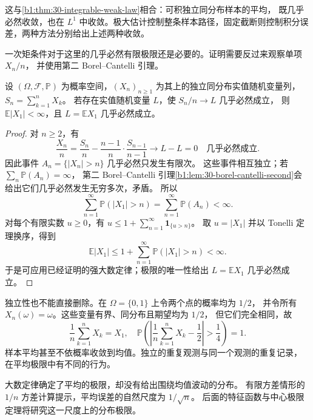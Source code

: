 这与\cref{b1:thm:30-integrable-weak-law}相合：可积独立同分布样本的平均，
既几乎必然收敛，也在 \(L^1\) 中收敛。极大估计控制整条样本路径，固定截断则控制积分误差，两种方法分别给出上述两种收敛。

\ProseParagraphBreak

一次矩条件对于这里的几乎必然有限极限还是必要的。证明需要反过来观察单项 \(X_n/n\)，
并使用第二 Borel--Cantelli 引理。

\begin{proposition}[有限极限所需的一次矩]
\label{b1:prop:30-strong-law-integrability-necessary}
设 \((\Omega,\mathcal F,\mathbb P)\) 为概率空间，\((X_n)_{n\geq1}\)
为其上的独立同分布实值随机变量列，\(S_n=\sum_{k=1}^nX_k\)。
若存在实值随机变量 \(L\)，使 \(S_n/n\to L\) 几乎必然成立，
则 \(\mathbb E|X_1|<\infty\)，且 \(L=\mathbb E X_1\) 几乎必然成立。
\end{proposition}
\begin{proof}
对 \(n\geq2\)，有
\[
 \frac{X_n}{n}
 =\frac{S_n}{n}-\frac{n-1}{n}\cdot\frac{S_{n-1}}{n-1}
 \longrightarrow L-L=0\quad\text{几乎必然成立}.
\]
因此事件 \(A_n=\{|X_n|>n\}\) 几乎必然只发生有限次。
这些事件相互独立；若 \(\sum_n\mathbb P(A_n)=\infty\)，
第二 Borel--Cantelli 引理\cref{b1:lem:30-borel-cantelli-second}会给出它们几乎必然发生无穷多次，矛盾。
所以
\[
 \sum_{n=1}^\infty\mathbb P(|X_1|>n)
 =\sum_{n=1}^\infty\mathbb P(A_n)<\infty.
\]
对每个有限实数 \(u\geq0\)，有
\(u\leq1+\sum_{n=1}^\infty\mathbf1_{\{u>n\}}\)。
取 \(u=|X_1|\) 并以 Tonelli 定理换序，得到
\[
 \mathbb E|X_1|
 \leq1+\sum_{n=1}^\infty\mathbb P(|X_1|>n)<\infty.
\]
于是可应用已经证明的强大数定律；极限的唯一性给出
\(L=\mathbb E X_1\) 几乎必然成立。
\end{proof}

独立性也不能直接删除。在 \(\Omega=\{0,1\}\) 上令两个点的概率均为 \(1/2\)，
并令所有 \(X_n(\omega)=\omega\)。这些变量有界、同分布且期望均为 \(1/2\)，
但它们完全相同，故
\[
 \frac1n\sum_{k=1}^nX_k=X_1,
 \quad
 \mathbb P\left(\left|\frac1n\sum_{k=1}^nX_k-\frac12\right|>\frac14\right)=1.
\]
样本平均甚至不依概率收敛到均值。独立的重复观测与同一个观测的重复记录，
在平均极限中有不同的行为。

\ProseParagraphBreak

大数定律确定了平均的极限，却没有给出围绕均值波动的分布。
有限方差情形的 \(1/n\) 方差计算提示，平均误差的自然尺度为 \(1/\sqrt n\)。
后面的特征函数与中心极限定理将研究这一尺度上的分布极限。
